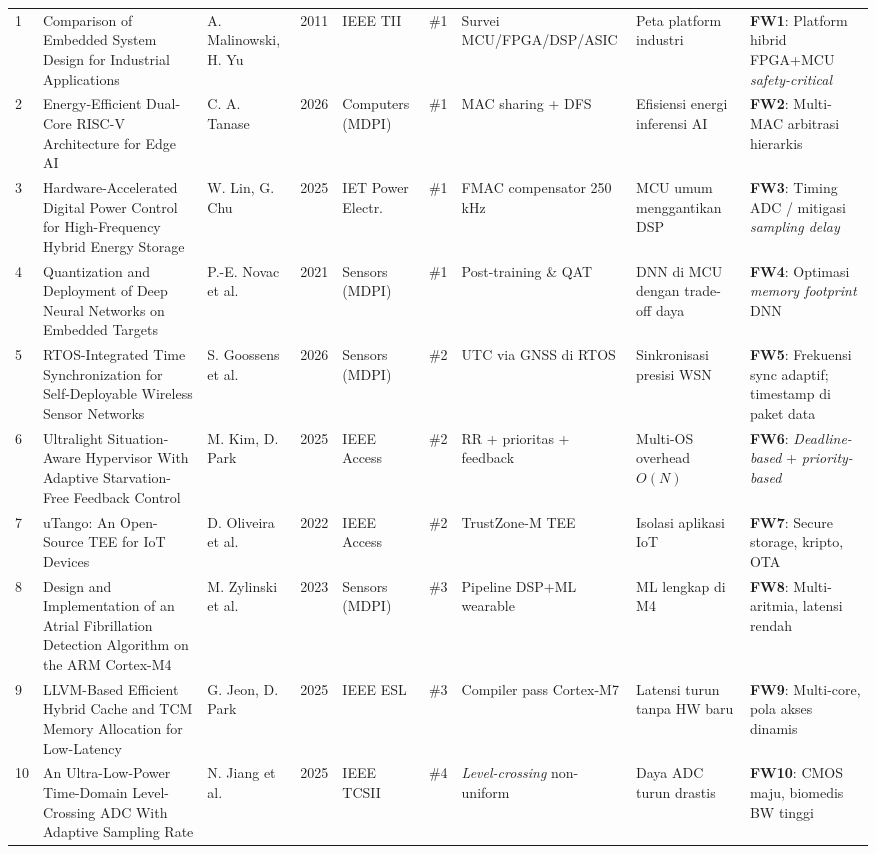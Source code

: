 \documentclass[12pt,a4paper]{article}
\begin{document}
\begin{landscape}
\begin{longtable}{@{}p{0.4cm}p{3.2cm}p{1.8cm}p{0.7cm}p{2.2cm}p{0.9cm}p{2.5cm}p{2.8cm}p{3.5cm}@{}}
1 & Comparison of Embedded System Design for Industrial Applications & A. Malinowski, H. Yu & 2011 & IEEE TII & \#1 & Survei MCU/FPGA/DSP/ASIC & Peta platform industri & \textbf{FW1}: Platform hibrid FPGA+MCU \textit{safety-critical} \\
2 & Energy-Efficient Dual-Core RISC-V Architecture for Edge AI & C. A. Tanase & 2026 & Computers (MDPI) & \#1 & MAC sharing + DFS & Efisiensi energi inferensi AI & \textbf{FW2}: Multi-MAC arbitrasi hierarkis \\
3 & Hardware-Accelerated Digital Power Control for High-Frequency Hybrid Energy Storage & W. Lin, G. Chu & 2025 & IET Power Electr. & \#1 & FMAC compensator 250\,kHz & MCU umum menggantikan DSP & \textbf{FW3}: Timing ADC / mitigasi \textit{sampling delay} \\
4 & Quantization and Deployment of Deep Neural Networks on Embedded Targets & P.-E. Novac et al. & 2021 & Sensors (MDPI) & \#1 & Post-training \& QAT & DNN di MCU dengan trade-off daya & \textbf{FW4}: Optimasi \textit{memory footprint} DNN \\
5 & RTOS-Integrated Time Synchronization for Self-Deployable Wireless Sensor Networks & S. Goossens et al. & 2026 & Sensors (MDPI) & \#2 & UTC via GNSS di RTOS & Sinkronisasi presisi WSN & \textbf{FW5}: Frekuensi sync adaptif; timestamp di paket data \\
6 & Ultralight Situation-Aware Hypervisor With Adaptive Starvation-Free Feedback Control & M. Kim, D. Park & 2025 & IEEE Access & \#2 & RR + prioritas + feedback & Multi-OS overhead $O(N)$ & \textbf{FW6}: \textit{Deadline-based} + \textit{priority-based} \\
7 & uTango: An Open-Source TEE for IoT Devices & D. Oliveira et al. & 2022 & IEEE Access & \#2 & TrustZone-M TEE & Isolasi aplikasi IoT & \textbf{FW7}: Secure storage, kripto, OTA \\
8 & Design and Implementation of an Atrial Fibrillation Detection Algorithm on the ARM Cortex-M4 & M. Zylinski et al. & 2023 & Sensors (MDPI) & \#3 & Pipeline DSP+ML wearable & ML lengkap di M4 & \textbf{FW8}: Multi-aritmia, latensi rendah \\
9 & LLVM-Based Efficient Hybrid Cache and TCM Memory Allocation for Low-Latency & G. Jeon, D. Park & 2025 & IEEE ESL & \#3 & Compiler pass Cortex-M7 & Latensi turun tanpa HW baru & \textbf{FW9}: Multi-core, pola akses dinamis \\
10 & An Ultra-Low-Power Time-Domain Level-Crossing ADC With Adaptive Sampling Rate & N. Jiang et al. & 2025 & IEEE TCSII & \#4 & \textit{Level-crossing} non-uniform & Daya ADC turun drastis & \textbf{FW10}: CMOS maju, biomedis BW tinggi \\

\end{longtable}
\end{landscape}
\end{document}
